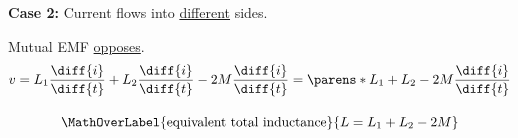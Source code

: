 \begin{multicols}{2}
\begin{CheatsheetEntryFrame}
        \textbf{Case 2:} Current flows into \ul{different} sides. \\[0mm]
         

         Mutual EMF \ul{opposes}.
        \begin{gather*}
            v
                = L_1 \frac{\diff{i}}{\diff{t}} + L_2 \frac{\diff{i}}{\diff{t}} - 2M \frac{\diff{i}}{\diff{t}}
                = \parens*{L_1 + L_2 - 2M} \frac{\diff{i}}{\diff{t}} \\[\abovedisplayskip]
            \MathOverLabel{\text{equivalent total inductance}}{L = L_1 + L_2 - 2M}
        \end{gather*}


    \end{CheatsheetEntryFrame}

\end{multicols}

